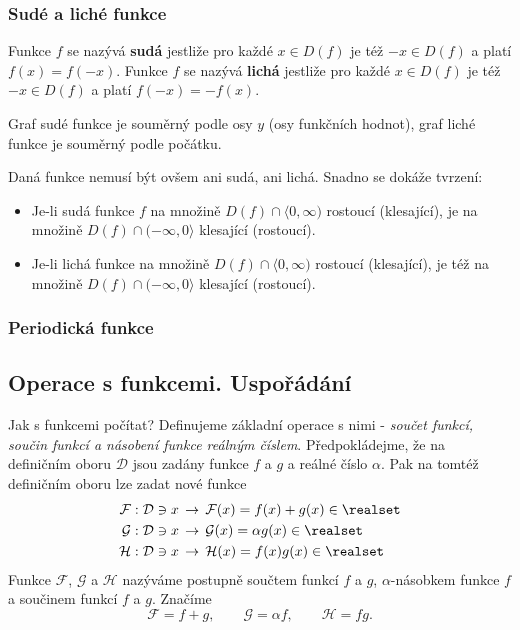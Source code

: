       \subsubsection{Sudé a liché funkce}
        \begin{definition}\label{MA1:def_lim04}
          Funkce $f$ se nazývá \textbf{sudá} jestliže pro každé $x\in D(f)$ je též $-x\in D(f)$  a 
          platí $f(x)=f(-x)$.
          Funkce $f$ se nazývá \textbf{lichá} jestliže pro každé $x\in D(f)$ je též $-x\in D(f)$  a 
          platí $f(-x)=-f(x)$. 
        \end{definition}
        Graf sudé funkce je souměrný podle osy \(y\) (osy funkčních hodnot), graf liché funkce je  
        souměrný podle počátku. 
 
         

        Daná funkce nemusí být ovšem ani sudá, ani lichá. Snadno se dokáže tvrzení:
        \begin{itemize}[noitemsep]
          \item Je-li sudá funkce $f$ na množině $D(f)\cap\langle0,\infty)$ rostoucí (klesající),
                je na množině $D(f)\cap(-\infty,0\rangle$ klesající (rostoucí).
          \item Je-li lichá funkce na množině $D(f)\cap\langle0,\infty)$ rostoucí (klesající),
                je též na množině $D(f)\cap(-\infty,0\rangle$ klesající (rostoucí).                 
        \end{itemize}
      \subsubsection{Periodická funkce}

    \subsection{Operace s funkcemi. Uspořádání}\label{mai:IchapIIIsecIssecIV}
      Jak s funkcemi počítat? Definujeme základní operace s nimi - \emph{součet funkcí, součin 
      funkcí a násobení funkce reálným číslem}. Předpokládejme, že na definičním oboru 
      \(\mathcal{D}\) jsou zadány funkce \(f\) a \(g\) a reálné číslo \(\alpha\). Pak na tomtéž 
      definičním oboru lze zadat nové funkce
      \begin{align*}
        \mathcal{F} &: \mathcal{D}\ni x\,\rightarrow\,\mathcal{F}(x) = f(x)+g(x)  \in\realset   \\
        \mathcal{G} &: \mathcal{D}\ni x\,\rightarrow\,\mathcal{G}(x) = \alpha g(x)\in\realset   \\
        \mathcal{H} &: \mathcal{D}\ni x\,\rightarrow\,\mathcal{H}(x) = f(x) g(x)  \in\realset 
      \end{align*}
      Funkce \(\mathcal{F}\), \(\mathcal{G}\) a \(\mathcal{H}\) nazýváme postupně součtem funkcí 
      \(f\) a \(g\), \(\alpha\)-násobkem funkce \(f\) a součinem funkcí \(f\) a \(g\). Značíme
      \begin{equation*}
       \mathcal{F} = f + g, \qquad \mathcal{G} = \alpha f, \qquad \mathcal{H} = fg. 
      \end{equation*}
      
